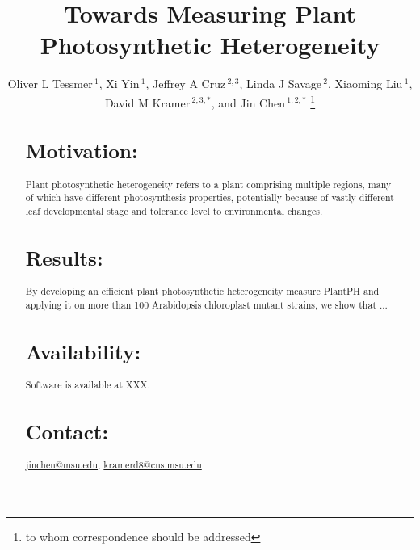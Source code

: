 \documentclass{bioinfo}
\begin{document}

\title{Towards Measuring Plant Photosynthetic Heterogeneity}
\author[Tessmer \textit{et~al}]{Oliver L Tessmer\,$^{1}$, Xi Yin\,$^{1}$, Jeffrey A Cruz\,$^{2,3}$, Linda J Savage\,$^{2}$, Xiaoming Liu\,$^{1}$, David M Kramer\,$^{2,3,\ast}$, and Jin Chen\,$^{1,2,\ast}$ \footnote{to whom correspondence should be addressed}}
\address{$^{1}$Department of Computer Science and Engineering, Michigan State University, East Lansing, MI 48824, USA\\
$^{2}$Department of Energy Plant Research Laboratory, Michigan State University, East Lansing, MI 48824, USA\\
$^{3}$Department of Biochemistry and Molecular Biology, Michigan State University, East Lansing, MI 48824, USA}



\maketitle

\begin{abstract}

\section{Motivation:} Plant photosynthetic heterogeneity refers to a plant comprising multiple regions, many of which have different photosynthesis properties, potentially because of vastly different leaf developmental stage and tolerance level to environmental changes. 

\section{Results:} By developing an efficient plant photosynthetic heterogeneity measure PlantPH and applying it on more than 100 Arabidopsis chloroplast mutant strains, we show that ...

\section{Availability:}
Software is available at XXX.

\section{Contact:} \href{jinchen@msu.edu}{jinchen@msu.edu}, \href{kramerd8@cns.msu.edu}{kramerd8@cns.msu.edu}
\end{abstract}
\end{document}
